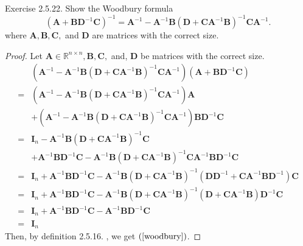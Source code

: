 \documentclass{article}
\theoremstyle{plain}
\begin{document}
\begin{itembox}[l]{Exercise 2.5.22.}
	Show the Woodbury formula
	\begin{equation}
		\label{woodbury}
		(\bm{A} + \bm{B} \bm{D}^{-1} \bm{C})^{-1} = \bm{A}^{-1} - \bm{A}^{-1} \bm{B} (\bm{D} + \bm{C} \bm{A}^{-1} \bm{B})^{-1} \bm{C} \bm{A}^{-1} .
	\end{equation}
	where
	\begin{math}
		\bm{A} , \bm{B} , \bm{C},
	\end{math}
	and $\bm{D}$ are matrices with the correct size.
\end{itembox}

\begin{proof}
	Let
	\begin{math}
		\bm{A} \in \mathbb{R}^{n \times n} , \bm{B} , \bm{C} ,
	\end{math}
	and, $\bm{D}$ be matrices with the correct size.
	\begin{equation*}
		\begin{split}
			&(\bm{A}^{-1} - \bm{A}^{-1} \bm{B} (\bm{D} + \bm{C} \bm{A}^{-1} \bm{B})^{-1} \bm{C} \bm{A}^{-1})(\bm{A} + \bm{B} \bm{D}^{-1} \bm{C}) \\
			=& (\bm{A}^{-1} - \bm{A}^{-1} \bm{B} (\bm{D} + \bm{C} \bm{A}^{-1} \bm{B})^{-1} \bm{C} \bm{A}^{-1}) \bm{A} \\
			&+ (\bm{A}^{-1} - \bm{A}^{-1} \bm{B} (\bm{D} + \bm{C} \bm{A}^{-1} \bm{B})^{-1} \bm{C} \bm{A}^{-1}) \bm{B} \bm{D}^{-1} \bm{C} \\
			=& \bm{I}_n - \bm{A}^{-1} \bm{B} (\bm{D} + \bm{C} \bm{A}^{-1} \bm{B})^{-1} \bm{C} \\
			&+ \bm{A}^{-1} \bm{B} \bm{D}^{-1} \bm{C} - \bm{A}^{-1} \bm{B} (\bm{D} + \bm{C} \bm{A}^{-1} \bm{B})^{-1} \bm{C} \bm{A}^{-1} \bm{B} \bm{D}^{-1} \bm{C} \\
			=& \bm{I}_n + \bm{A}^{-1} \bm{B} \bm{D}^{-1} \bm{C} - \bm{A}^{-1} \bm{B} (\bm{D} + \bm{C} \bm{A}^{-1} \bm{B})^{-1} (\bm{D} \bm{D}^{-1} + \bm{C} \bm{A}^{-1} \bm{B} \bm{D}^{-1}) \bm{C} \\
			=& \bm{I}_n + \bm{A}^{-1} \bm{B} \bm{D}^{-1} \bm{C} - \bm{A}^{-1} \bm{B} (\bm{D} + \bm{C} \bm{A}^{-1} \bm{B})^{-1} (\bm{D} + \bm{C} \bm{A}^{-1} \bm{B}) \bm{D}^{-1} \bm{C} \\
			=& \bm{I}_n + \bm{A}^{-1} \bm{B} \bm{D}^{-1} \bm{C} - \bm{A}^{-1} \bm{B} \bm{D}^{-1} \bm{C} \\
			=& \bm{I}_n
		\end{split}
	\end{equation*}
	Then, by definition 2.5.16. , we get $(\ref{woodbury})$.
\end{proof}
\end{document}

